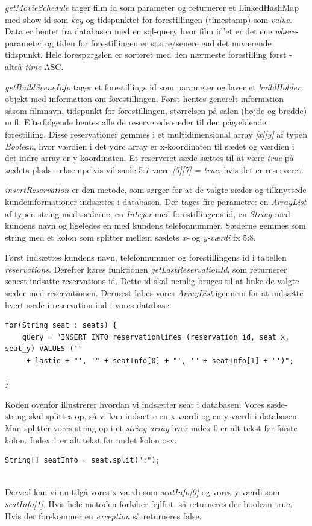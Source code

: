 \documentclass[final]{report}
\begin{document}
\emph{getMovieSchedule} tager film id som parameter og returnerer et LinkedHashMap med show id som \emph{key} og tidspunktet for forestillingen (timestamp) som \emph{value}. Data er hentet fra databasen med en sql-query hvor film id’et er det ene \emph{where}-parameter og tiden for forestillingen er større/senere end det nuværende tidspunkt. Hele forespørgslen er sorteret med den nærmeste forestilling først - altså \emph{time} ASC. 

\emph{getBuildSceneInfo} tager et forestillings id som parameter og laver et \emph{buildHolder} objekt med information om forestillingen. Først hentes generelt information såsom filmnavn, tidspunkt for forestillingen, størrelsen på salen (højde og bredde) m.fl. Efterfølgende hentes alle de reserverede sæder til den pågældende forestilling. Disse reservationer gemmes i et multidimensional array \emph{[x][y]} af typen \emph{Boolean}, hvor værdien i det ydre array er x-koordinaten til sædet og værdien i det indre array er y-koordinaten. Et reserveret sæde sættes til at være \emph{true} på sædets plads - eksempelvis vil sæde 5:7 være \emph{[5][7] = true}, hvis det er reserveret. 

\emph{insertReservation} er den metode, som sørger for at de valgte sæder og tilknyttede kundeinformationer indsættes i databasen. Der tages fire parametre: en \emph{ArrayList} af typen string med sæderne, en \emph{Integer} med forestillingens id, en \emph{String} med kundens navn og ligeledes en med kundens telefonnummer. Sæderne gemmes som string med et kolon som splitter mellem sædets \emph{x-} og \emph{y-værdi} fx 5:8.

Først indsættes kundens navn, telefonnummer og forestillingens id i tabellen \emph{reservations}. Derefter køres funktionen \emph{getLastReservationId}, som returnerer senest indsatte reservations id. Dette id skal nemlig bruges til at linke de valgte sæder med reservationen. Dernæst løbes vores \emph{ArrayList} igennem for at indsætte hvert sæde i reservation ind i vores database. \\
\begin{verbatim}
for(String seat : seats) {
    query = "INSERT INTO reservationlines (reservation_id, seat_x, seat_y) VALUES ('"
     + lastid + "', '" + seatInfo[0] + "', '" + seatInfo[1] + "')";
  
}
\end{verbatim}

Koden ovenfor illustrerer hvordan vi indsætter seat i databasen. Vores sæde-string skal splittes op, så vi kan indsætte en x-værdi og en y-værdi i databasen. Man splitter vores string op i et \emph{string-array} hvor index 0 er alt tekst før første kolon. Index 1 er alt tekst før andet kolon osv. \\
\begin{verbatim}
String[] seatInfo = seat.split(":");
\end{verbatim}\\
Derved kan vi nu tilgå vores x-værdi som \emph{seatInfo[0]} og vores y-værdi som \emph{seatInfo[1]}. Hvis hele metoden forløber fejlfrit, så returneres der boolean true. Hvis der forekommer en \emph{exception} så returneres false. 
\end{document}
